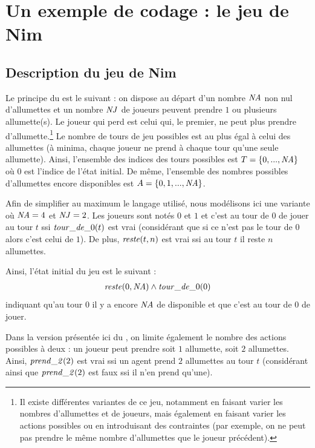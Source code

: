 
\section{Un exemple de codage : le jeu de Nim}
\subsection{Description du jeu de Nim}

Le principe du \game est le suivant : on dispose au départ d'un nombre $\nbAllumettes$ non nul d'allumettes
et un nombre $\nbJoueurs$ de joueurs peuvent prendre $1$ ou plusieurs allumette(s). Le joueur qui perd est celui qui, le premier, ne peut plus prendre d'allumette.\footnote{Il existe différentes variantes de ce jeu, notamment en faisant varier les nombres d'allumettes et de joueurs, mais également en faisant varier les actions possibles ou en introduisant des contraintes (par exemple, on ne peut pas prendre le même nombre d'allumettes que le joueur précédent).} Le nombre de tours de jeu possibles est au plus égal à celui des allumettes (à minima, chaque joueur ne prend à chaque tour qu'une seule allumette). Ainsi, l'ensemble des indices des tours possibles est $\turnsSet = \{ 0, ..., \nbAllumettes \}$ où $0$ est l'indice de l'état initial. De même, l'ensemble des nombres possibles d'allumettes encore disponibles est $\matchesSet = \{ 0, 1, ..., \nbAllumettes \}$.

Afin de simplifier au maximum le langage utilisé, nous modélisons ici une variante où $\nbAllumettes = 4$ et $\nbJoueurs = 2$. Les joueurs sont notés $0$ et $1$ et c'est au tour de $0$ de jouer au tour $t$ ssi $\turn{t}$ est vrai (considérant que si ce n'est pas le tour de $0$ alors c'est celui de $1$). De plus, $\rest{t}{n}$ est vrai ssi au tour $t$ il reste $n$ allumettes.

Ainsi, l'état initial du jeu est le suivant : 
\begin{gather}
\rest{0}{\nbAllumettes} \land \turn{0}
\label{eq:initialState}
\end{gather}
indiquant qu'au tour $0$ il y a encore $\nbAllumettes$ de disponible et que c'est au tour de $0$ de jouer.

Dans la version présentée ici du \game, on limite également le nombre des actions possibles à deux : un joueur peut prendre soit $1$ allumette, soit $2$ allumettes. Ainsi, $\takes{t}$ est vrai ssi un agent prend $2$ allumettes au tour $t$ (considérant ainsi que $\takes{t}$ est faux ssi il n'en prend qu'une). 

